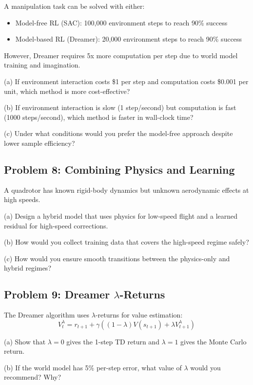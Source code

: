 A manipulation task can be solved with either:
\begin{itemize}
    \item Model-free RL (SAC): 100,000 environment steps to reach 90\% success
    \item Model-based RL (Dreamer): 20,000 environment steps to reach 90\% success
\end{itemize}

However, Dreamer requires 5x more computation per step due to world model training and imagination.

(a) If environment interaction costs \$1 per step and computation costs \$0.001 per unit, which method is more cost-effective?

(b) If environment interaction is slow (1 step/second) but computation is fast (1000 steps/second), which method is faster in wall-clock time?

(c) Under what conditions would you prefer the model-free approach despite lower sample efficiency?

\subsection{Problem 8: Combining Physics and Learning}

A quadrotor has known rigid-body dynamics but unknown aerodynamic effects at high speeds.

(a) Design a hybrid model that uses physics for low-speed flight and a learned residual for high-speed corrections.

(b) How would you collect training data that covers the high-speed regime safely?

(c) How would you ensure smooth transitions between the physics-only and hybrid regimes?

\subsection{Problem 9: Dreamer $\lambda$-Returns}

The Dreamer algorithm uses $\lambda$-returns for value estimation:
\begin{equation}
V_t^\lambda = r_{t+1} + \gamma \left((1-\lambda) V(s_{t+1}) + \lambda V_{t+1}^\lambda\right)
\end{equation}

(a) Show that $\lambda = 0$ gives the 1-step TD return and $\lambda = 1$ gives the Monte Carlo return.

(b) If the world model has 5\% per-step error, what value of $\lambda$ would you recommend? Why?

